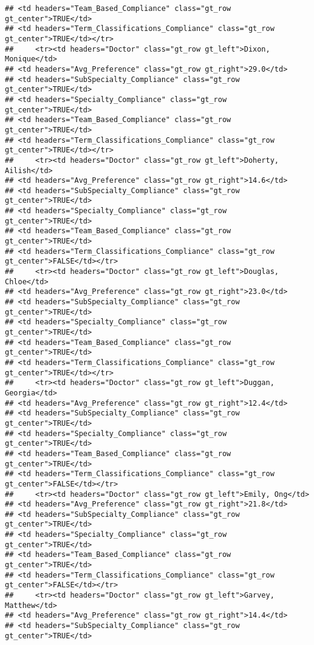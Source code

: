 \documentclass[
]{article}
\begin{document}
\begin{verbatim}
## <td headers="Team_Based_Compliance" class="gt_row gt_center">TRUE</td>
## <td headers="Term_Classifications_Compliance" class="gt_row gt_center">TRUE</td></tr>
##     <tr><td headers="Doctor" class="gt_row gt_left">Dixon, Monique</td>
## <td headers="Avg_Preference" class="gt_row gt_right">29.0</td>
## <td headers="SubSpecialty_Compliance" class="gt_row gt_center">TRUE</td>
## <td headers="Specialty_Compliance" class="gt_row gt_center">TRUE</td>
## <td headers="Team_Based_Compliance" class="gt_row gt_center">TRUE</td>
## <td headers="Term_Classifications_Compliance" class="gt_row gt_center">TRUE</td></tr>
##     <tr><td headers="Doctor" class="gt_row gt_left">Doherty, Ailish</td>
## <td headers="Avg_Preference" class="gt_row gt_right">14.6</td>
## <td headers="SubSpecialty_Compliance" class="gt_row gt_center">TRUE</td>
## <td headers="Specialty_Compliance" class="gt_row gt_center">TRUE</td>
## <td headers="Team_Based_Compliance" class="gt_row gt_center">TRUE</td>
## <td headers="Term_Classifications_Compliance" class="gt_row gt_center">FALSE</td></tr>
##     <tr><td headers="Doctor" class="gt_row gt_left">Douglas, Chloe</td>
## <td headers="Avg_Preference" class="gt_row gt_right">23.0</td>
## <td headers="SubSpecialty_Compliance" class="gt_row gt_center">TRUE</td>
## <td headers="Specialty_Compliance" class="gt_row gt_center">TRUE</td>
## <td headers="Team_Based_Compliance" class="gt_row gt_center">TRUE</td>
## <td headers="Term_Classifications_Compliance" class="gt_row gt_center">TRUE</td></tr>
##     <tr><td headers="Doctor" class="gt_row gt_left">Duggan, Georgia</td>
## <td headers="Avg_Preference" class="gt_row gt_right">12.4</td>
## <td headers="SubSpecialty_Compliance" class="gt_row gt_center">TRUE</td>
## <td headers="Specialty_Compliance" class="gt_row gt_center">TRUE</td>
## <td headers="Team_Based_Compliance" class="gt_row gt_center">TRUE</td>
## <td headers="Term_Classifications_Compliance" class="gt_row gt_center">FALSE</td></tr>
##     <tr><td headers="Doctor" class="gt_row gt_left">Emily, Ong</td>
## <td headers="Avg_Preference" class="gt_row gt_right">21.8</td>
## <td headers="SubSpecialty_Compliance" class="gt_row gt_center">TRUE</td>
## <td headers="Specialty_Compliance" class="gt_row gt_center">TRUE</td>
## <td headers="Team_Based_Compliance" class="gt_row gt_center">TRUE</td>
## <td headers="Term_Classifications_Compliance" class="gt_row gt_center">FALSE</td></tr>
##     <tr><td headers="Doctor" class="gt_row gt_left">Garvey, Matthew</td>
## <td headers="Avg_Preference" class="gt_row gt_right">14.4</td>
## <td headers="SubSpecialty_Compliance" class="gt_row gt_center">TRUE</td>

\end{verbatim}
\end{document}
